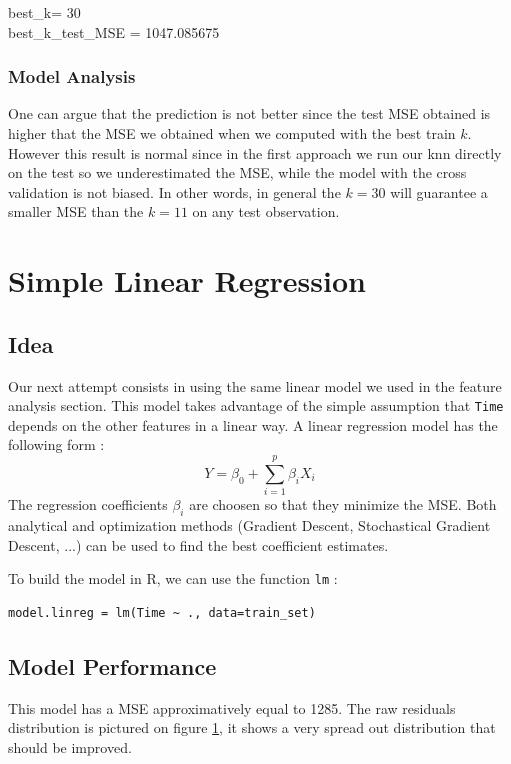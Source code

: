 \documentclass[]{report}
\newcommand{\inputtikz}[2]{%
	\scalebox{#1}{}  
}
\begin{document}
\begin{center} 
	best\_k= 30 \\
	best\_k\_test\_MSE = 1047.085675
\end{center}

\subsubsection{Model Analysis}
One can argue that the prediction is not better since the test MSE obtained is higher that the MSE we obtained when we computed with the best train $k$. However this result is normal since in the first approach we run our knn directly on the test so we underestimated the MSE, while the model with the cross validation is not biased. In other words, in general the $k=30$ will guarantee a smaller MSE than the $k=11$ on any test observation.

\section{Simple Linear Regression}
\subsection{Idea}
Our next attempt consists in using the same linear model we used in the feature analysis section. This model takes advantage of the simple assumption that \texttt{Time} depends on the other features in a linear way. A linear regression model has the following form :
$$
	Y = \beta_0 + \sum_{i = 1}^{p} \beta_i X_i
$$
The regression coefficients $\beta_i$ are choosen so that they minimize the MSE. Both analytical and optimization methods (Gradient Descent, Stochastical Gradient Descent, ...) can be used to find the best coefficient estimates.

To build the model in R, we can use the function \texttt{lm} :
\begin{lstlisting}
model.linreg = lm(Time ~ ., data=train_set)
\end{lstlisting}

\subsection{Model Performance}
This model has a MSE approximatively equal to 1285. The raw residuals distribution is pictured on figure \ref{fig:linreg_hist}, it shows a very spread out distribution that should be improved.

\begin{figure}[!h]
	\centering
	\inputtikz{0.5}{Figures/linreg_hist.tex}
	\caption{}
	\label{fig:linreg_hist}
\end{figure}
\end{document}
